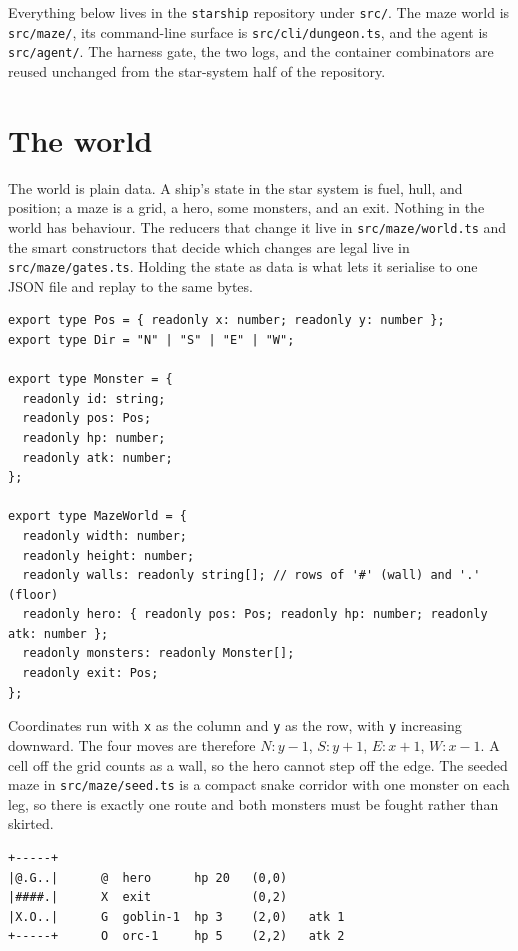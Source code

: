 \documentclass[11pt]{article}
\newcommand{\code}[1]{\texttt{#1}}
\begin{document}
Everything below lives in the \code{starship} repository under \code{src/}. The
maze world is \code{src/maze/}, its command-line surface is
\code{src/cli/dungeon.ts}, and the agent is \code{src/agent/}. The harness gate,
the two logs, and the container combinators are reused unchanged from the
star-system half of the repository.

\section{The world}

The world is plain data. A ship's state in the star system is fuel, hull, and
position; a maze is a grid, a hero, some monsters, and an exit. Nothing in the
world has behaviour. The reducers that change it live in \code{src/maze/world.ts}
and the smart constructors that decide which changes are legal live in
\code{src/maze/gates.ts}. Holding the state as data is what lets it serialise to
one JSON file and replay to the same bytes.

\begin{lstlisting}[language=TS]
export type Pos = { readonly x: number; readonly y: number };
export type Dir = "N" | "S" | "E" | "W";

export type Monster = {
  readonly id: string;
  readonly pos: Pos;
  readonly hp: number;
  readonly atk: number;
};

export type MazeWorld = {
  readonly width: number;
  readonly height: number;
  readonly walls: readonly string[]; // rows of '#' (wall) and '.' (floor)
  readonly hero: { readonly pos: Pos; readonly hp: number; readonly atk: number };
  readonly monsters: readonly Monster[];
  readonly exit: Pos;
};
\end{lstlisting}

Coordinates run with \code{x} as the column and \code{y} as the row, with
\code{y} increasing downward. The four moves are therefore $N\!:y{-}1$,
$S\!:y{+}1$, $E\!:x{+}1$, $W\!:x{-}1$. A cell off the grid counts as a wall, so
the hero cannot step off the edge. The seeded maze in \code{src/maze/seed.ts} is
a compact snake corridor with one monster on each leg, so there is exactly one
route and both monsters must be fought rather than skirted.

\begin{lstlisting}
+-----+
|@.G..|      @  hero      hp 20   (0,0)
|####.|      X  exit              (0,2)
|X.O..|      G  goblin-1  hp 3    (2,0)   atk 1
+-----+      O  orc-1     hp 5    (2,2)   atk 2
\end{lstlisting}
\end{document}
